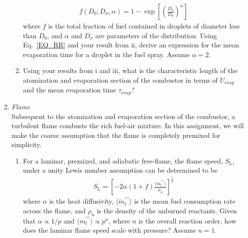 \documentclass[11pt]{article}
\begin{document}
\begin{enumerate}[label=(\alph*)]
\begin{enumerate}[label=(\roman*)]
                \begin{equation}
                	\label{EQ_RR}
                	\begin{aligned}
                    	f(D_0;D_\sigma,\alpha)=1-\exp\left[\left(\frac{D_0}{D_\sigma}\right)^\alpha\right]
                    \end{aligned}
                \end{equation}
                where $f$ is the total fraction of fuel contained in droplets of diameter less than $D_0$, and $\alpha$ and $D_\sigma$ are parameters of the distribution. Using Eq.~\ref{EQ_RR} and your result from ii, derive an expression for the mean evaporation time for a droplet in the fuel spray. Assume $\alpha=2$.
        	\item
            	Using your results from i and iii, what is the characteristic length of the atomization and evaporation section of the combustor in terms of $U_\mathrm{evap}$ and the mean evaporation time $\tau_\mathrm{evap}$? 
        \end{enumerate}
    \item \textit{Flame}\\
    	Subsequent to the atomization and evaporation section of the combustor, a turbulent flame combusts the rich fuel-air mixture. In this assignment, we will make the coarse assumption that the flame is completely premixed for simplicity.  
        \begin{enumerate}[label=(\roman*)]
        	\item
            	For a laminar, premixed, and adiabatic free-flame, the flame speed, $S_\mathrm{L}$, under a unity Lewis number assumption can be determined to be
                \begin{equation}
                	\label{EQ_SL}
                	\begin{aligned}
                    	S_\mathrm{L}=\left[-2\alpha(1+f)\frac{\langle\dot m_\mathrm{f}^{\prime \prime \prime}\rangle}{\rho_\mathrm{u}}\right]^{\frac{1}{2}}
                    \end{aligned}
                \end{equation}
                where $\alpha$ is the heat diffusivity, $\langle\dot m_\mathrm{f}^{\prime \prime \prime}\rangle$ is the mean fuel consumption rate across the flame, and $\rho_\mathrm{u}$ is the density of the unburned reactants. Given that $\alpha\propto 1/p$ and $\langle\dot m_\mathrm{f}^{\prime \prime \prime}\rangle\propto p^n$, where $n$ is the overall reaction order, how does the laminar flame speed scale with pressure? Assume $n=1$.

\end{enumerate}
\end{enumerate}
\end{document}
